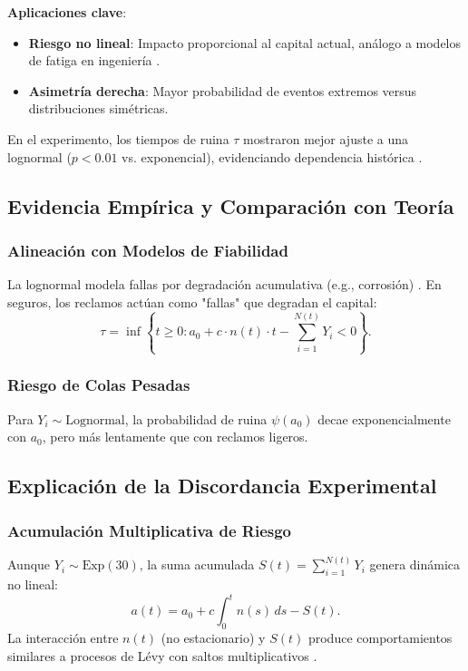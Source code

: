 \documentclass{article}
\begin{document}
\textbf{Aplicaciones clave}:
\begin{itemize}
    \item \textbf{Riesgo no lineal}: Impacto proporcional al capital actual, análogo a modelos de fatiga en ingeniería \cite{ref1}.
    \item \textbf{Asimetría derecha}: Mayor probabilidad de eventos extremos versus distribuciones simétricas.
\end{itemize}

En el experimento, los tiempos de ruina \( \tau \) mostraron mejor ajuste a una lognormal (\( p < 0.01 \) vs. exponencial), evidenciando dependencia histórica .

\subsection{Evidencia Empírica y Comparación con Teoría}
\subsubsection{Alineación con Modelos de Fiabilidad}
La lognormal modela fallas por degradación acumulativa (e.g., corrosión) \cite{ref1}. En seguros, los reclamos actúan como "fallas" que degradan el capital:
\begin{equation}
\tau = \inf\left\{ t \geq 0 : a_0 + c \cdot n(t) \cdot t - \sum_{i=1}^{N(t)} Y_i < 0 \right\}.
\end{equation}

\subsubsection{Riesgo de Colas Pesadas}
Para \( Y_i \sim \text{Lognormal} \), la probabilidad de ruina \( \psi(a_0) \) decae exponencialmente con \( a_0 \), pero más lentamente que con reclamos ligeros.

\subsection{Explicación de la Discordancia Experimental}
\subsubsection{Acumulación Multiplicativa de Riesgo}
Aunque \( Y_i \sim \text{Exp}(30) \), la suma acumulada \( S(t) = \sum_{i=1}^{N(t)} Y_i \) genera dinámica no lineal:
\begin{equation}
a(t) = a_0 + c \int_0^t n(s) \, ds - S(t).
\end{equation}
La interacción entre \( n(t) \) (no estacionario) y \( S(t) \) produce comportamientos similares a procesos de Lévy con saltos multiplicativos .
\end{document}
